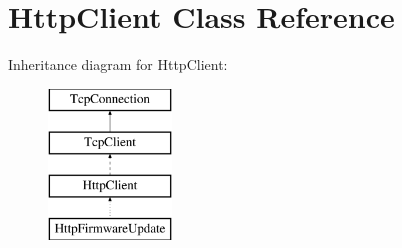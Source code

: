 \hypertarget{class_http_client}{}\section{Http\+Client Class Reference}
\label{class_http_client}
Inheritance diagram for Http\+Client\+:\begin{figure}[H]
\begin{center}
\leavevmode
\includegraphics[height=4.000000cm]{class_http_client}
\end{center}
\end{figure}
